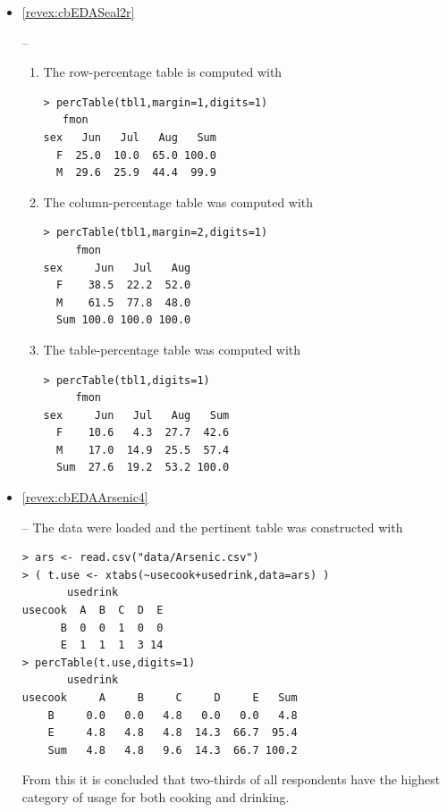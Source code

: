 \documentclass[10pt,openany]{book}\usepackage[]{graphicx}\usepackage[]{color}
\makeatletter
\newenvironment{kframe}{%
 \def\at@end@of@kframe{}%
 \ifinner\ifhmode%
  \def\at@end@of@kframe{\end{minipage}}%
  \begin{minipage}{\columnwidth}%
 \fi\fi%
 \def\FrameCommand##1{\hskip\@totalleftmargin \hskip-\fboxsep
 \colorbox{shadecolor}{##1}\hskip-\fboxsep
     \hskip-\linewidth \hskip-\@totalleftmargin \hskip\columnwidth}%
 \MakeFramed {\advance\hsize-\width
   \@totalleftmargin\z@ \linewidth\hsize
   \@setminipage}}%
 {\par\unskip\endMakeFramed%
 \at@end@of@kframe}
\newenvironment{knitrout}{}{} %
\makeatother
\begin{document}
\begin{itemize}
  \item \hypertarget{ans:cbEDASeal2r}{\ref{revex:cbEDASeal2r}} --
    \begin{enumerate}
      \item The row-percentage table is computed with
\begin{knitrout}
\color{fgcolor}\begin{kframe}
\begin{verbatim}
> percTable(tbl1,margin=1,digits=1)
   fmon
sex   Jun   Jul   Aug   Sum
  F  25.0  10.0  65.0 100.0
  M  29.6  25.9  44.4  99.9
\end{verbatim}
\end{kframe}
\end{knitrout}
      \item The column-percentage table was computed with
\begin{knitrout}
\color{fgcolor}\begin{kframe}
\begin{verbatim}
> percTable(tbl1,margin=2,digits=1)
     fmon
sex     Jun   Jul   Aug
  F    38.5  22.2  52.0
  M    61.5  77.8  48.0
  Sum 100.0 100.0 100.0
\end{verbatim}
\end{kframe}
\end{knitrout}
      \item The table-percentage table was computed with
\begin{knitrout}
\color{fgcolor}\begin{kframe}
\begin{verbatim}
> percTable(tbl1,digits=1)
     fmon
sex     Jun   Jul   Aug   Sum
  F    10.6   4.3  27.7  42.6
  M    17.0  14.9  25.5  57.4
  Sum  27.6  19.2  53.2 100.0
\end{verbatim}
\end{kframe}
\end{knitrout}
    \end{enumerate}

  \item \hypertarget{ans:cbEDAArsenic4}{\ref{revex:cbEDAArsenic4}} -- The data were loaded and the pertinent table was constructed with
\begin{knitrout}
\color{fgcolor}\begin{kframe}
\begin{verbatim}
> ars <- read.csv("data/Arsenic.csv")
> ( t.use <- xtabs(~usecook+usedrink,data=ars) )
       usedrink
usecook  A  B  C  D  E
      B  0  0  1  0  0
      E  1  1  1  3 14
> percTable(t.use,digits=1)
       usedrink
usecook     A     B     C     D     E   Sum
    B     0.0   0.0   4.8   0.0   0.0   4.8
    E     4.8   4.8   4.8  14.3  66.7  95.4
    Sum   4.8   4.8   9.6  14.3  66.7 100.2
\end{verbatim}
\end{kframe}
\end{knitrout}
From this it is concluded that two-thirds of all respondents have the highest category of usage for both cooking and drinking.



\end{itemize}
\end{document}
